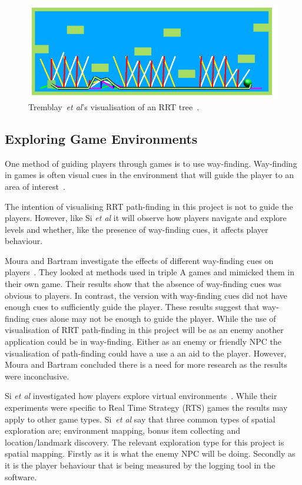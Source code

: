 \documentclass[journal]{IEEEtran}
\begin{document}
\begin{figure}[h]
	\includegraphics[width=1.0\linewidth]{Tremblay2014.png}
	\caption{ Tremblay~\textit{et al}'s visualisation of an RRT tree~\cite{Tremblay2014}.}
	\label{Tremblay2014}
\end{figure} 



\subsection{Exploring Game Environments}
One method of guiding players through games is to use way-finding. Way-finding in games is often visual cues in the environment that will guide the player to an area of interest~\cite{si2017, Bacim2008}. 

The intention of visualising RRT path-finding in this project is not to guide the players. However, like Si \textit{et al}  it will observe how players navigate and explore levels and whether, like the presence of way-finding cues, it affects player behaviour. 

Moura and Bartram investigate the effects of different way-finding cues on players~\cite{moura2014}.  They looked at methods used in triple A games and mimicked them in their own game. Their results show that the absence of way-finding cues was obvious to players. In contrast, the version with way-finding cues did not have enough cues to sufficiently guide the player. These results suggest that way-finding cues alone may not be enough to guide the player. While the use of visualisation of RRT path-finding in this project will be as an enemy another application could be in way-finding. Either as an enemy or friendly NPC the visualisation of path-finding could have a use a an aid to the player. However, Moura and Bartram concluded there is a need for more research as the results were inconclusive. 
 
Si \textit{et al} investigated how players explore virtual environments~\cite{si2017}. While their experiments were specific to Real Time Strategy (RTS) games the results may apply to other game types. Si~\textit{et al} say that three common types of spatial exploration are; environment mapping, bonus item collecting and location/landmark discovery. The relevant exploration type for this project is spatial mapping. Firstly as it is what the enemy NPC will be doing.  Secondly as it is the player behaviour that is being measured by the logging tool in the software.
\end{document}
